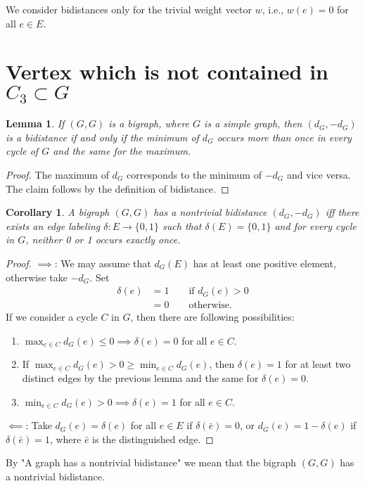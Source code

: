 \documentclass[a4paper, 11pt]{article}
\newtheorem{lem}[thm]{Lemma}
\newtheorem{cor}[thm]{Corollary}
\theoremstyle{definition}
\begin{document}
We consider bidistances only for the trivial weight vector $w$, i.e., $w(e)=0$ for all $e\in E$.

\section{Vertex which is not contained in $C_3\subset G$}
\begin{lem}
If $(G,G)$ is a bigraph, where $G$ is a simple graph, then $(d_G, -d_G)$ is a bidistance if and only if the minimum of $d_G$ occurs more than once in every cycle of $G$ and the same for the maximum.
\end{lem}
\begin{proof}
The maximum of $d_G$ corresponds to the minimum of $-d_G$ and vice versa. The claim follows by the definition of bidistance.
\end{proof}

\begin{cor}
\label{cor:binaryLabelling}
A bigraph $(G,G)$ has a nontrivial bidistance $(d_G, -d_G)$ iff there exists an edge labeling $\delta:E\rightarrow \{0,1\}$ such that $\delta(E)=\{0,1\}$ and for every cycle in $G$, neither 0 or 1 occurs exactly once.
\end{cor}
\begin{proof}
$\implies$: We may assume that $d_G(E)$ has at least one positive element, otherwise take $-d_G$. Set
\begin{align*}
\delta(e)&=1 \qquad \text{if } d_G(e)>0 \\
		&=0 \qquad \text{otherwise.}
\end{align*}
If we consider a cycle $C$ in $G$, then there are following possibilities:
\begin{enumerate}
	\item $\max_{e\in C} d_G(e) \leq 0 \implies \delta(e)=0$ for all $e \in C$.
	\item If $\max_{e\in C} d_G(e) > 0 \geq \min_{e\in C} d_G(e)$, then $\delta(e)=1$ for at least two distinct edges by the previous lemma and the same for $\delta(e)=0$.
	\item $\min_{e\in C} d_G(e) > 0 \implies \delta(e)=1$ for all $e \in C$.
\end{enumerate}
$\impliedby$: Take $d_G(e)=\delta(e)$ for all $e\in E$ if $\delta(\bar{e})=0$, or $d_G(e)=1-\delta(e)$ if $\delta(\bar{e})=1$, where $\bar{e}$ is the distinguished edge.
\end{proof}

By "A graph has a nontrivial bidistance" we mean that the bigraph $(G,G)$ has a nontrivial bidistance.
\end{document}
